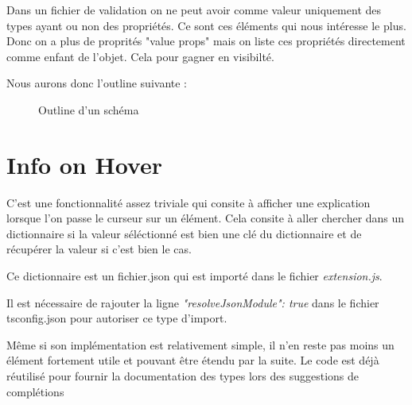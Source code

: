 \documentclass[
    iict, %
    il, %
]{heig-tb}
\begin{document}
Dans un fichier de validation on ne peut avoir comme valeur uniquement des types ayant ou non des propriétés. Ce sont ces éléments qui nous intéresse le plus.
Donc on a plus de proprités "value props" mais on liste ces propriétés directement comme enfant de l'objet. Cela pour gagner en visibilté.

Nous aurons donc l'outline suivante :

\begin{figure}[!h]
    \begin{center}
    \end{center}
    \caption[Outline d'un schéma]{\label{uon-schema-outline} Outline d'un schéma}
\end{figure}

\section{Info on Hover}

C'est une fonctionnalité assez triviale qui consite à afficher une explication lorsque l'on passe le curseur sur un élément.
Cela consite à aller chercher dans un dictionnaire si la valeur séléctionné est bien une clé du dictionnaire et de récupérer la valeur si c'est bien le cas.

Ce dictionnaire est un fichier.json qui est importé dans le fichier \emph{extension.js}.

Il est nécessaire de rajouter la ligne \emph{"resolveJsonModule": true} dans le fichier tsconfig.json pour autoriser ce type d'import.

Même si son implémentation est relativement simple, il n'en reste pas moins un élément fortement utile et pouvant être étendu par la suite.
Le code est déjà réutilisé pour fournir la documentation des types lors des suggestions de complétions  %
\end{document}
